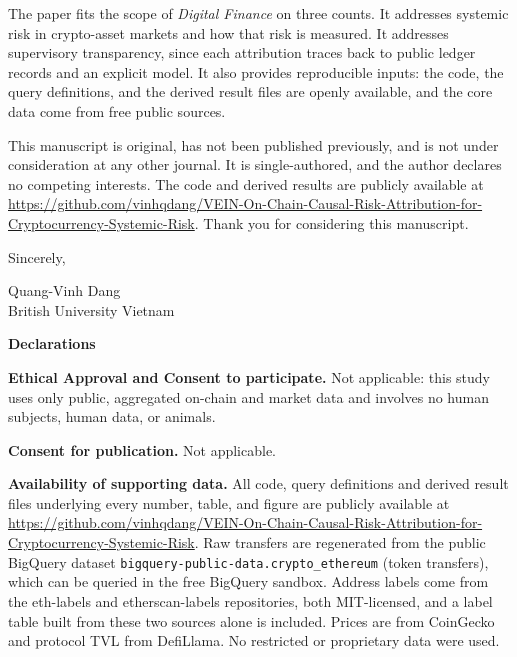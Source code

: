 \documentclass[11pt]{article}
\begin{document}
The paper fits the scope of \emph{Digital Finance} on three counts. It addresses
systemic risk in crypto-asset markets and how that risk is measured. It addresses
supervisory transparency, since each attribution traces back to public ledger
records and an explicit model. It also provides reproducible inputs: the code, the
query definitions, and the derived result files are openly available, and the
core data come from free public sources.

This manuscript is original, has not been published previously, and is not under
consideration at any other journal. It is single-authored, and the author declares
no competing interests. The code and derived results are publicly available at
\url{https://github.com/vinhqdang/VEIN-On-Chain-Causal-Risk-Attribution-for-Cryptocurrency-Systemic-Risk}.
Thank you for considering this manuscript.

\vspace{1.5em}
\noindent Sincerely,

\vspace{0.5em}
\noindent Quang-Vinh Dang\\
British University Vietnam

\bigskip
\hrulefill

\vspace{1.5em}
\begin{center}
{\LARGE\bfseries Declarations}
\end{center}

\vspace{1em}
\noindent\textbf{Ethical Approval and Consent to participate.} Not
applicable: this study uses only public, aggregated on-chain and market data
and involves no human subjects, human data, or animals.

\vspace{0.8em}
\noindent\textbf{Consent for publication.} Not applicable.

\vspace{0.8em}
\noindent\textbf{Availability of supporting data.} All code, query definitions and
derived result files underlying every number, table, and figure are publicly
available at
\url{https://github.com/vinhqdang/VEIN-On-Chain-Causal-Risk-Attribution-for-Cryptocurrency-Systemic-Risk}.
Raw transfers are regenerated from the public BigQuery dataset
\texttt{bigquery-public-data.crypto\_ethereum} (token transfers), which can be
queried in the free BigQuery sandbox. Address labels come from the eth-labels and
etherscan-labels repositories, both MIT-licensed, and a label table built from
these two sources alone is included. Prices are from CoinGecko and protocol TVL
from DefiLlama. No restricted or proprietary data were used.
\end{document}
